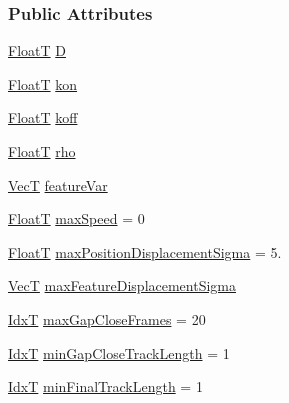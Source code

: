 \subsubsection*{Public Attributes}
\begin{DoxyCompactItemize}
\item 
\hyperlink{classtracker_1_1Tracker_a66e8a81f12871e23082264c964f8f103}{FloatT} \hyperlink{classtracker_1_1LAPTrack_aeb0584b18f32b86e395de5a973108187}{D}
\item 
\hyperlink{classtracker_1_1Tracker_a66e8a81f12871e23082264c964f8f103}{FloatT} \hyperlink{classtracker_1_1LAPTrack_ad0e45f79d117cd5156818f27c3a41d45}{kon}
\item 
\hyperlink{classtracker_1_1Tracker_a66e8a81f12871e23082264c964f8f103}{FloatT} \hyperlink{classtracker_1_1LAPTrack_a726079bfbbc885c065086b76ee549bfa}{koff}
\item 
\hyperlink{classtracker_1_1Tracker_a66e8a81f12871e23082264c964f8f103}{FloatT} \hyperlink{classtracker_1_1LAPTrack_a67d4adb49fbda172c6ea701c93985713}{rho}
\item 
\hyperlink{classtracker_1_1Tracker_a9905fa9b81b252716e651d87d7d57aff}{VecT} \hyperlink{classtracker_1_1LAPTrack_a69599f06e61865ba634d6c88a1119319}{feature\+Var}
\item 
\hyperlink{classtracker_1_1Tracker_a66e8a81f12871e23082264c964f8f103}{FloatT} \hyperlink{classtracker_1_1LAPTrack_a8da459415ca2bb4f3d57b3c8db87e66e}{max\+Speed} = 0
\item 
\hyperlink{classtracker_1_1Tracker_a66e8a81f12871e23082264c964f8f103}{FloatT} \hyperlink{classtracker_1_1LAPTrack_ad3662aeeb356ae8dd4070f583a8ba9c9}{max\+Position\+Displacement\+Sigma} = 5.
\item 
\hyperlink{classtracker_1_1Tracker_a9905fa9b81b252716e651d87d7d57aff}{VecT} \hyperlink{classtracker_1_1LAPTrack_a220f2d5a80b5999ed3c70e31a04901b0}{max\+Feature\+Displacement\+Sigma}
\item 
\hyperlink{classtracker_1_1Tracker_ad39a875dc6957cb6a9f3affcf6517d80}{IdxT} \hyperlink{classtracker_1_1LAPTrack_a3b70051e6eb22f9798c865109740ab48}{max\+Gap\+Close\+Frames} = 20
\item 
\hyperlink{classtracker_1_1Tracker_ad39a875dc6957cb6a9f3affcf6517d80}{IdxT} \hyperlink{classtracker_1_1LAPTrack_a580b1ec32d1e21c40e5a19f3f26518b4}{min\+Gap\+Close\+Track\+Length} = 1
\item 
\hyperlink{classtracker_1_1Tracker_ad39a875dc6957cb6a9f3affcf6517d80}{IdxT} \hyperlink{classtracker_1_1LAPTrack_a9a856327b91dddeb277b8a3633184cb3}{min\+Final\+Track\+Length} = 1

\end{DoxyCompactItemize}
